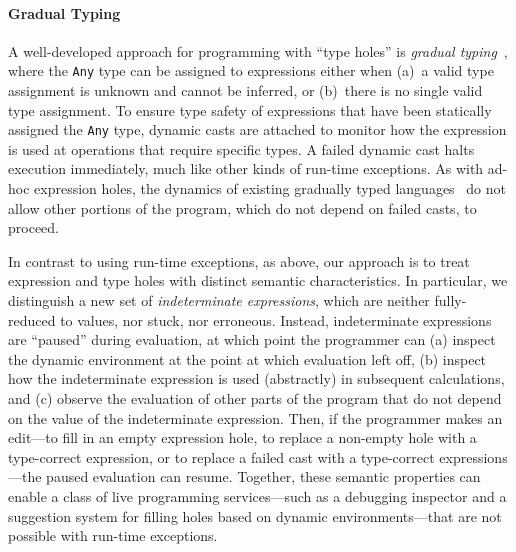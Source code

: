 
\paragraph{Gradual Typing}
%
A well-developed approach for programming with ``type holes'' is \emph{gradual
typing}~\cite{XXX,XXX,XXX,XXX}, where the \verb+Any+ type can be assigned to
expressions either when
%
(a)~a valid type assignment is unknown and cannot be inferred, or
%
(b)~there is no single valid type assignment.
%
To ensure type safety of expressions that have been statically assigned the
\verb+Any+ type, dynamic casts are attached to monitor how the expression is
used at operations that require specific types.
%
A failed dynamic cast halts execution immediately, much like other kinds of
run-time exceptions.
%
As with ad-hoc expression holes, the dynamics of existing gradually typed
languages~\cite{XXX,XXX,XXX,XXX} do not allow other portions of the program,
which do not depend on failed casts, to proceed. 


In contrast to using run-time exceptions, as above, our approach is to treat
expression and type holes with distinct semantic characteristics.
%
In particular, we distinguish a new set of \emph{indeterminate expressions},
which are neither fully-reduced to values, nor stuck, nor erroneous.
%
Instead, indeterminate expressions are ``paused'' during evaluation, at which
point the programmer can
%
(a) inspect the dynamic environment at the point at which evaluation left off,
%
(b) inspect how the indeterminate expression is used (abstractly) in subsequent
calculations, and
%
(c) observe the evaluation of other parts of the program that do not depend on
the value of the indeterminate expression.
%
Then, if the programmer makes an edit---to fill in an empty expression hole, to
replace a non-empty hole with a type-correct expression, or to replace a failed
cast with a type-correct expressions---the paused evaluation can resume.
%
Together, these semantic properties can enable a class of live programming
services---such as a debugging inspector and a suggestion system for filling
holes based on dynamic environments---that are not possible with run-time
exceptions.


